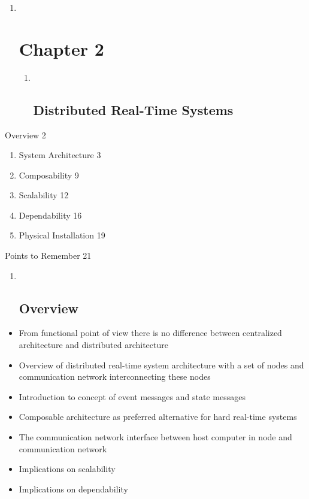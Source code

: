 \begin{enumerate}
\item ~
  \section{Chapter 2}\label{chapter-2}

  \begin{enumerate}
  \item ~
    \subsection{Distributed Real-Time
    Systems}\label{distributed-real-time-systems}
  \end{enumerate}
\end{enumerate}

Overview 2

\begin{enumerate}
\def\labelenumi{\arabic{enumi}.}
\item
  System Architecture 3
\item
  Composability 9
\item
  Scalability 12
\item
  Dependability 16
\item
  Physical Installation 19
\end{enumerate}

Points to Remember 21

\begin{enumerate}
\item ~
  \subsection{}\label{section}

  \subsection{Overview}\label{overview}
\end{enumerate}

\begin{itemize}
\item
  From functional point of view there is no difference between
  centralized architecture and distributed architecture
\item
  Overview of distributed real-time system architecture with a set of
  nodes and communication network interconnecting these nodes
\item
  Introduction to concept of event messages and state messages
\item
  Composable architecture as preferred alternative for hard real-time
  systems
\item
  The communication network interface between host computer in node and
  communication network
\item
  Implications on scalability
\item
  Implications on dependability
\end{itemize}

